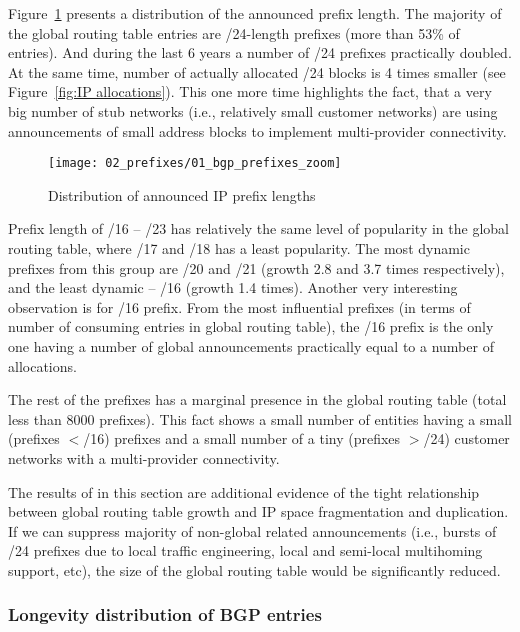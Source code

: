 Figure~\ref{fig:bgp prefix distribution} presents a distribution of the
announced prefix length. The majority of the global routing table entries are
/24-length prefixes (more than 53\% of entries). And during the last 6 years a
number of /24 prefixes practically doubled. At the same time, number of
actually allocated /24 blocks is 4 times smaller (see Figure~\ref{fig:IP
allocations}). This one more time highlights the fact, that a very big number
of stub networks (i.e., relatively small customer networks) are using
announcements of small address blocks to implement multi-provider
connectivity.

\begin{figure}[htbp]
	\centering
		\texttt{[image: 02\_prefixes/01\_bgp\_prefixes\_zoom]}
	\caption{Distribution of announced IP prefix lengths}
	\label{fig:bgp prefix distribution}
\end{figure}

Prefix length of /16 -- /23 has relatively the same level of popularity in the
global routing table, where /17 and /18 has a least popularity. The most
dynamic prefixes from this group are /20 and /21 (growth 2.8 and 3.7 times
respectively), and the least dynamic -- /16 (growth 1.4 times). Another very
interesting observation is for /16 prefix. From the most influential prefixes
(in terms of number of consuming entries in global routing table), the /16
prefix is the only one having a number of global announcements practically
equal to a number of allocations.

The rest of the prefixes has a marginal presence in the global routing table
(total less than 8000 prefixes). This fact shows a small number of entities
having a small (prefixes $<$/16) prefixes and a small number of a tiny
(prefixes $>$/24) customer networks with a multi-provider connectivity.

The results of in this section are additional evidence of the tight
relationship between global routing table growth and IP space fragmentation
and duplication. If we can suppress majority of non-global related
announcements (i.e., bursts of /24 prefixes due to local traffic engineering,
local and semi-local multihoming support, etc), the size of the global routing
table would be significantly reduced.

\subsubsection{Longevity distribution of BGP entries}

